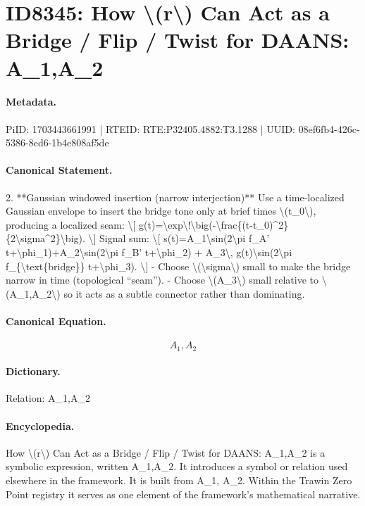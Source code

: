 \section*{ID8345: How \textbackslash{}(r\textbackslash{}) Can Act as a Bridge / Flip / Twist for DAANS: A\_1,A\_2}
\paragraph{Metadata.}
PiID: 1703443661991 | RTEID: RTE:P32405.4882:T3.1288 | UUID: 08ef6fb4-426c-5386-8ed6-1b4e808af5de

\paragraph{Canonical Statement.}
2. **Gaussian windowed insertion (narrow interjection)** Use a time-localized Gaussian envelope to insert the bridge tone only at brief times \textbackslash{}(t\_0\textbackslash{}), producing a localized seam: \textbackslash{}[ g(t)=\textbackslash{}exp\textbackslash{}!\textbackslash{}big(-\textbackslash{}frac\{(t-t\_0)\textasciicircum{}2\}\{2\textbackslash{}sigma\textasciicircum{}2\}\textbackslash{}big). \textbackslash{}] Signal sum: \textbackslash{}[ s(t)=A\_1\textbackslash{}sin(2\textbackslash{}pi f\_A' t+\textbackslash{}phi\_1)+A\_2\textbackslash{}sin(2\textbackslash{}pi f\_B' t+\textbackslash{}phi\_2) + A\_3\textbackslash{}, g(t)\textbackslash{}sin(2\textbackslash{}pi f\_\{\textbackslash{}text\{bridge\}\} t+\textbackslash{}phi\_3). \textbackslash{}] - Choose \textbackslash{}(\textbackslash{}sigma\textbackslash{}) small to make the bridge narrow in time (topological “seam”). - Choose \textbackslash{}(A\_3\textbackslash{}) small relative to \textbackslash{}(A\_1,A\_2\textbackslash{}) so it acts as a subtle connector rather than dominating.

\paragraph{Canonical Equation.}
\[
A_1,A_2
\]

\paragraph{Dictionary.}
Relation: A\_1,A\_2

\paragraph{Encyclopedia.}
How \textbackslash{}(r\textbackslash{}) Can Act as a Bridge / Flip / Twist for DAANS: A\_1,A\_2 is a symbolic expression, written A\_1,A\_2. It introduces a symbol or relation used elsewhere in the framework. It is built from A\_1, A\_2. Within the Trawin Zero Point registry it serves as one element of the framework's mathematical narrative.
